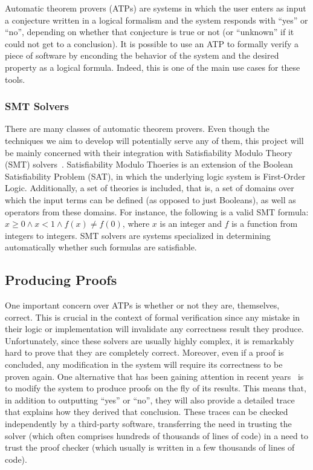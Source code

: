 \documentclass[a4paper, 12pt]{article}
\begin{document}

Automatic theorem provers (ATPs) are systems in which the user enters as input a conjecture written in
a logical
formalism and the system responds with ``yes'' or ``no'', depending on whether that conjecture is true or
not (or ``unknown'' if it could not get to a conclusion).
It is possible to use an ATP to formally verify a piece of software by enconding the behavior of the system
and the desired property as a logical formula. Indeed, this is one of the main use cases for these tools.

\subsubsection{SMT Solvers}

There are many classes of automatic theorem provers. Even though the techniques we aim
to develop will potentially serve any of them, this project will be mainly concerned with
their integration with Satisfiability Modulo Theory (SMT) solvers~\cite{smtbook}.
Satisfiability Modulo Thoeries is an extension of the Boolean Satisfiability Problem (SAT),
in which the underlying logic system is First-Order Logic. Additionally, a set of theories
is included, that is, a set of domains over which the input terms can be defined (as opposed
to just Booleans), as well as operators from these domains. For instance, the following is
a valid SMT formula: $x \ge 0 \wedge x < 1 \wedge f(x) \neq f(0)$, where $x$ is an integer
and $f$ is a function from integers to integers.
%
SMT solvers are systems specialized in determining automatically whether such formulas are satisfiable.

\subsection{Producing Proofs}
One important concern over ATPs is whether or not they are, themselves, correct. This is crucial
in the context of formal verification since any mistake in their logic or implementation will invalidate any
correctness result they produce. Unfortunately, since these solvers are usually highly complex,
it is remarkably hard to prove that they are completely correct. Moreover, even if a proof is concluded,
any modification in the system will require its correctness to be proven again. One alternative that has been
gaining attention in recent years~\cite{generatingProofs, proofsInSmt} is to modify the system to produce
proofs on the fly of its results. This means that, in addition to outputting ``yes'' or ``no'', they will
also provide a detailed trace that explains how they derived that conclusion. These traces can be
checked independently by a third-party software, transferring the need in trusting the solver (which often
comprises hundreds of thousands of lines of code) in a need to trust the proof checker (which usually is
written in a few thousands of lines of code).
\end{document}
